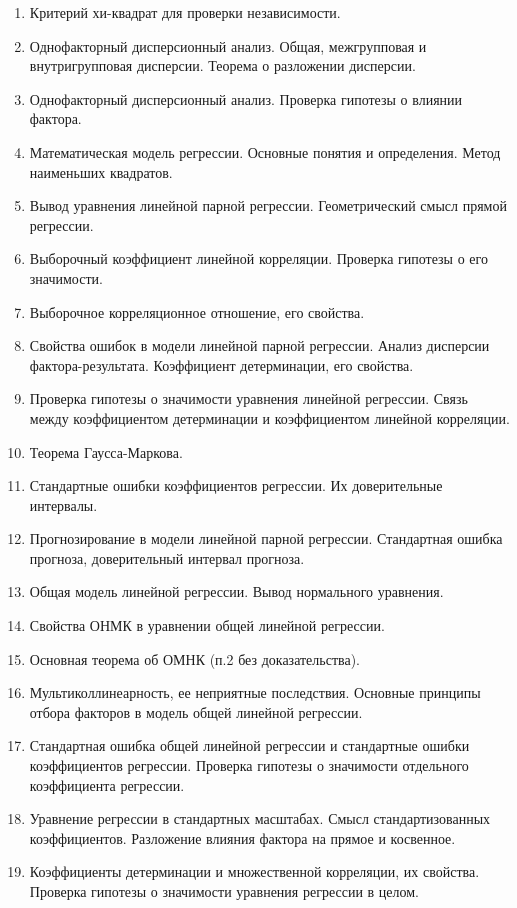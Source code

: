 \documentclass[12pt]{article}
\begin{document}
\begin{enumerate}
    \item Критерий хи-квадрат для проверки независимости.
    \item Однофакторный дисперсионный анализ. Общая, межгрупповая и внутригрупповая дисперсии. Теорема о разложении дисперсии.
    \item Однофакторный дисперсионный анализ. Проверка гипотезы о влиянии фактора.
    \item Математическая модель регрессии. Основные понятия и определения. Метод наименьших квадратов.
    \item Вывод уравнения линейной парной регрессии. Геометрический смысл прямой регрессии.
    \item Выборочный коэффициент линейной корреляции. Проверка гипотезы о его значимости.
    \item Выборочное корреляционное отношение, его свойства.
    \item Свойства ошибок в модели линейной парной регрессии. Анализ дисперсии фактора-результата. Коэффициент детерминации, его свойства.
    \item Проверка гипотезы о значимости уравнения линейной регрессии. Связь между коэффициентом детерминации и коэффициентом линейной корреляции.
    \item Теорема Гаусса-Маркова.
    \item Стандартные ошибки коэффициентов регрессии. Их доверительные интервалы.
    \item Прогнозирование в модели линейной парной регрессии. Стандартная ошибка прогноза, доверительный интервал прогноза.
    \item Общая модель линейной регрессии. Вывод нормального уравнения.
    \item Свойства ОНМК в уравнении общей линейной регрессии.
    \item Основная теорема об ОМНК (п.2 без доказательства).
    \item Мультиколлинеарность, ее неприятные последствия. Основные принципы отбора факторов в модель общей линейной регрессии.
    \item Стандартная ошибка общей линейной регрессии и стандартные ошибки коэффициентов регрессии. Проверка гипотезы о значимости отдельного коэффициента регрессии.
    \item Уравнение регрессии в стандартных масштабах. Смысл стандартизованных коэффициентов. Разложение влияния фактора на прямое и косвенное.
    \item Коэффициенты детерминации и множественной корреляции, их свойства. Проверка гипотезы о значимости уравнения регрессии в целом.

\end{enumerate}
\end{document}
